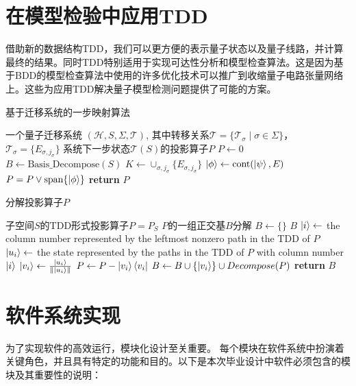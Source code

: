 \section{在模型检验中应用TDD}
借助新的数据结构TDD，我们可以更方便的表示量子状态以及量子线路，并计算最终的结果。同时TDD特别适用于实现可达性分析和模型检查算法。这是因为基于BDD的模型检查算法中使用的许多优化技术可以推广到收缩量子电路张量网络上\citep{Chaki_2018}。这些为应用TDD解决量子模型检测问题提供了可能的方案。
\begin{algorithm}
\caption{基于迁移系统的一步映射算法}
\label{alg-image}
\begin{algorithmic}[1] %
\Require 一个量子迁移系统 $(\mathcal{H},S,\Sigma,\mathcal{T})$, 其中转移关系$\mathcal{T}=\{\mathcal{T}_\sigma\mid \sigma\in \Sigma\}$，  $\mathcal{T}_\sigma=\{E_{\sigma,j_\sigma}\}$
\Ensure 系统下一步状态$\mathcal{T}(S)$的投影算子$P$
\State $P \gets 0$ 
\State $B \gets \text{Basis\_Decompose}(S)$
\State $K \gets \cup_{\sigma,j_\sigma}\{E_{\sigma,j_\sigma}\}$
    \State $\ket{\phi} \gets \text{cont}(\ket{\psi},E)$
    \State $P=P \vee \text{span}\{\ket{\phi}\}$
\EndFor
\State \textbf{return} $P$ 
\end{algorithmic}
\end{algorithm}

\begin{algorithm} 
	\caption{分解投影算子$P$}
	\label{alg-basis_dec} 
	\begin{algorithmic}[1]
		\Require 子空间$S$的TDD形式投影算子$P=P_S$ 
		\Ensure $P$的一组正交基$B$分解
		\State $B\gets \{\}$
		\Return $B$
		\Else
		\State $\ket{i} \gets$ the column number represented by the leftmost nonzero path in the TDD of $P$
		\State $\ket{u_i}\gets$ the state represented by the paths in the TDD of $P$ with column number $\ket{i}$
		\State $\ket{v_i} \gets \frac{\ket{u_i}}{\|\ket{u_i}\|}$
		\State $P \gets P - \ket{v_i}\bra{v_i}$
		\State $B \gets B \cup \{\ket{v_i}\} \cup Decompose(P)$
		\EndIf
		\State \textbf{return} $B$ 
	\end{algorithmic}
\end{algorithm}

\section{软件系统实现}
为了实现软件的高效运行，模块化设计至关重要。
每个模块在软件系统中扮演着关键角色，并且具有特定的功能和目的。以下是本次毕业设计中软件必须包含的模块及其重要性的说明：


